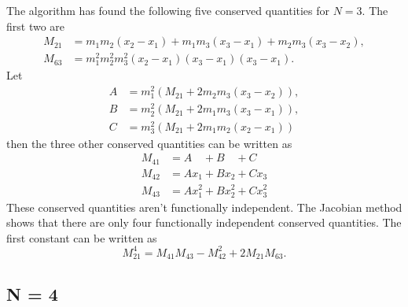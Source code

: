 \documentclass[english,master]{liumaiex}
\theoremstyle{plain}
\theoremstyle{definition}
\begin{document}
The algorithm has found the following five conserved quantities for $N = 3$.  The first two are
\begin{align}
	M_{21} &= m_1m_2(x_2 - x_1) + m_1m_3(x_3 - x_1) + m_2m_3(x_3 - x_2), \\
	M_{63} &= m_1^2m_2^2m_3^2(x_2 - x_1)(x_3 - x_1)(x_3 - x_1).
\end{align}
Let
\begin{align}
	A & = m_1^2(M_{21} + 2m_2m_3(x_3-x_2)), \\
	B & = m_2^2(M_{21} + 2m_1m_3(x_3-x_1)), \\
	C & = m_3^2(M_{21} + 2m_1m_2(x_2-x_1))
\end{align}
then the three other conserved quantities can be written as
\begin{align}
	M_{41} &= A\phantom{x_1} + B\phantom{x_2} + C\phantom{x_3} \\
	M_{42} &= Ax_1 + Bx_2 + Cx_3 \\
	M_{43} &= Ax_1^2 + Bx_2^2 + Cx_3^2
\end{align}
These conserved quantities aren't functionally independent. The Jacobian method shows that there are only four functionally independent conserved quantities. The first constant can be written as
\begin{equation}
	M_{21}^4 = M_{41}M_{43} - M_{42}^2 + 2M_{21}M_{63}.
\end{equation}


\subsection*{N = 4}
\end{document}
